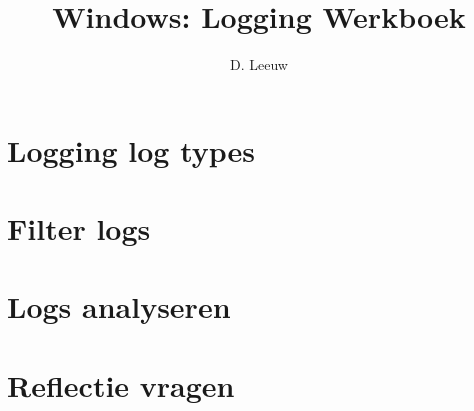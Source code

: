 \documentclass[a4paper,12pt,twoside,titlepage]{article}
\author{D. Leeuw}
\title{Windows: Logging Werkboek}
\date{\today\\
0.0.0
\vfill
\raggedright
\copyright\ 2026 Dennis Leeuw\\
}
\begin{document}

\maketitle



\section{Logging log types}

\section{Filter logs}

\section{Logs analyseren}

\section{Reflectie vragen}



\printindex
\end{document}
